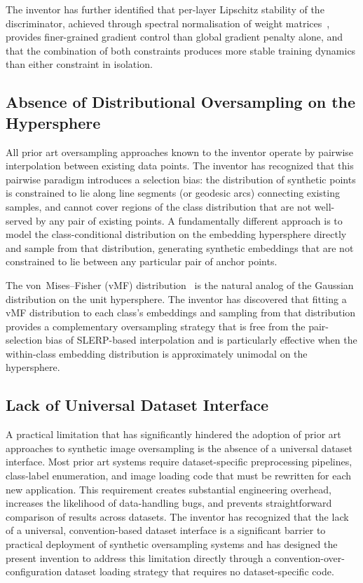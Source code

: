 \documentclass[12pt,letterpaper]{article}
\begin{document}
The inventor has further identified that per-layer Lipschitz stability of the
discriminator, achieved through spectral normalisation of weight
matrices~\cite{miyato2018}, provides finer-grained gradient control than
global gradient penalty alone, and that the combination of both constraints
produces more stable training dynamics than either constraint in isolation.

\subsection{Absence of Distributional Oversampling on the Hypersphere}

All prior art oversampling approaches known to the inventor operate by
pairwise interpolation between existing data points.  The inventor has
recognized that this pairwise paradigm introduces a selection bias: the
distribution of synthetic points is constrained to lie along line segments
(or geodesic arcs) connecting existing samples, and cannot cover regions of
the class distribution that are not well-served by any pair of existing
points.  A fundamentally different approach is to model the class-conditional
distribution on the embedding hypersphere directly and sample from that
distribution, generating synthetic embeddings that are not constrained to
lie between any particular pair of anchor points.

The von~Mises--Fisher (vMF) distribution~\cite{mardia2000,banerjee2005}
is the natural analog of the Gaussian distribution on the unit hypersphere.
The inventor has discovered that fitting a vMF distribution to each class's
embeddings and sampling from that distribution provides a complementary
oversampling strategy that is free from the pair-selection bias of
SLERP-based interpolation and is particularly effective when the within-class
embedding distribution is approximately unimodal on the hypersphere.

\subsection{Lack of Universal Dataset Interface}

A practical limitation that has significantly hindered the adoption of prior
art approaches to synthetic image oversampling is the absence of a universal
dataset interface.  Most prior art systems require dataset-specific
preprocessing pipelines, class-label enumeration, and image loading code that
must be rewritten for each new application.  This requirement creates
substantial engineering overhead, increases the likelihood of data-handling
bugs, and prevents straightforward comparison of results across datasets.
The inventor has recognized that the lack of a universal,
convention-based dataset interface is a significant barrier to practical
deployment of synthetic oversampling systems and has designed the present
invention to address this limitation directly through a
convention-over-configuration dataset loading strategy that requires no
dataset-specific code.
\end{document}
